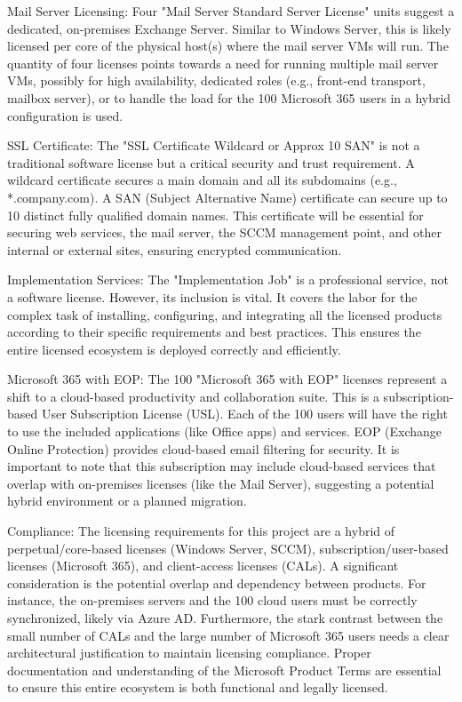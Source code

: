 Mail Server Licensing:
Four "Mail Server Standard Server License" units suggest a dedicated, on-premises Exchange Server. Similar to Windows Server, this is likely licensed per core of the physical host(s) where the mail server VMs will run. The quantity of four licenses points towards a need for running multiple mail server VMs, possibly for high availability, dedicated roles (e.g., front-end transport, mailbox server), or to handle the load for the 100 Microsoft 365 users in a hybrid configuration is used.

SSL Certificate:
The "SSL Certificate Wildcard or Approx 10 SAN" is not a traditional software license but a critical security and trust requirement. A wildcard certificate secures a main domain and all its subdomains (e.g., *.company.com). A SAN (Subject Alternative Name) certificate can secure up to 10 distinct fully qualified domain names. This certificate will be essential for securing web services, the mail server, the SCCM management point, and other internal or external sites, ensuring encrypted communication.

Implementation Services:
The "Implementation Job" is a professional service, not a software license. However, its inclusion is vital. It covers the labor for the complex task of installing, configuring, and integrating all the licensed products according to their specific requirements and best practices. This ensures the entire licensed ecosystem is deployed correctly and efficiently.

Microsoft 365 with EOP:
The 100 "Microsoft 365 with EOP" licenses represent a shift to a cloud-based productivity and collaboration suite. This is a subscription-based User Subscription License (USL). Each of the 100 users will have the right to use the included applications (like Office apps) and services. EOP (Exchange Online Protection) provides cloud-based email filtering for security. It is important to note that this subscription may include cloud-based services that overlap with on-premises licenses (like the Mail Server), suggesting a potential hybrid environment or a planned migration.

Compliance:
The licensing requirements for this project are a hybrid of perpetual/core-based licenses (Windows Server, SCCM), subscription/user-based licenses (Microsoft 365), and client-access licenses (CALs). A significant consideration is the potential overlap and dependency between products. For instance, the on-premises servers and the 100 cloud users must be correctly synchronized, likely via Azure AD. Furthermore, the stark contrast between the small number of CALs and the large number of Microsoft 365 users needs a clear architectural justification to maintain licensing compliance. Proper documentation and understanding of the Microsoft Product Terms are essential to ensure this entire ecosystem is both functional and legally licensed.

